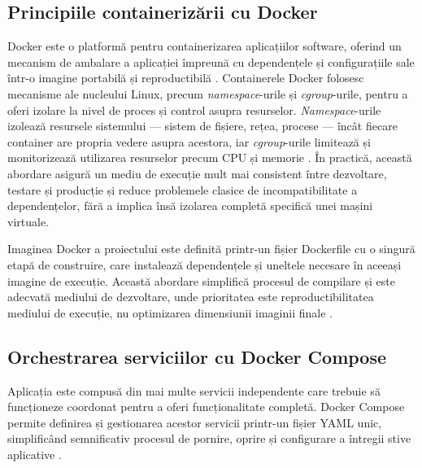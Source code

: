 \documentclass[12pt, a4paper, oneside, romanian]{teza-upb}
\begin{document}
\subsection{Principiile containerizării cu Docker}

Docker este o platformă pentru containerizarea aplicațiilor software, 
oferind un mecanism de ambalare a aplicației împreună cu dependențele 
și configurațiile sale într-o imagine portabilă și reproductibilă 
\cite{docker_doc}. Containerele Docker folosesc mecanisme ale nucleului Linux, precum \textit{namespace}-urile și \textit{cgroup}-urile, pentru a oferi izolare la nivel de proces și control asupra resurselor. \textit{Namespace}-urile izolează resursele sistemului — sistem de fișiere, rețea, procese — încât fiecare container are propria 
vedere asupra acestora, iar \textit{cgroup}-urile limitează și monitorizează utilizarea 
resurselor precum CPU și memorie \cite{docker_doc}. În practică, această abordare asigură un mediu de execuție mult mai consistent între dezvoltare, testare și producție și reduce problemele clasice de incompatibilitate a dependențelor, fără a implica însă izolarea completă specifică unei mașini virtuale.

Imaginea Docker a proiectului este definită printr-un fișier Dockerfile cu o singură etapă de construire, care instalează dependențele și uneltele necesare în aceeași imagine de execuție. Această abordare simplifică procesul de compilare și este adecvată mediului de dezvoltare, unde prioritatea este reproductibilitatea mediului de execuție, nu optimizarea dimensiunii imaginii finale \cite{docker_doc}.


\subsection{Orchestrarea serviciilor cu Docker Compose}

Aplicația este compusă din mai multe servicii independente care trebuie să funcționeze coordonat pentru a oferi funcționalitate completă. Docker Compose permite definirea și gestionarea acestor servicii printr-un fișier YAML unic, simplificând semnificativ procesul de pornire, oprire și configurare a întregii stive aplicative \cite{docker_compose_doc}.
\end{document}
